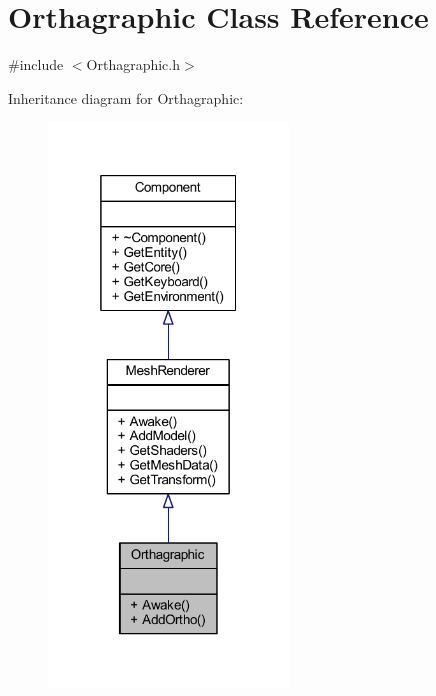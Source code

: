 \hypertarget{class_orthagraphic}{}\section{Orthagraphic Class Reference}
\label{class_orthagraphic}


{\ttfamily \#include $<$Orthagraphic.\+h$>$}



Inheritance diagram for Orthagraphic\+:
\nopagebreak
\begin{figure}[H]
\begin{center}
\leavevmode
\includegraphics[width=181pt]{class_orthagraphic__inherit__graph}
\end{center}
\end{figure}



